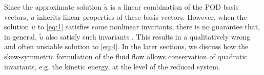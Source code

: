 Since the approximate solution $\tilde u$ is a linear combination of the POD basis vectors, $\tilde u$ inherits linear properties of these basis vectors. However, when the solution $u$ to \eqref{eq:1} satisfies some nonlinear invariants, there is no guarantee that, in general, $\tilde u$ also satisfy such invariants \cite{doi:10.1137/140959602,doi:10.1137/140978922,doi:10.1137/17M1111991,MaboudiAfkham2018}. This results in a qualitatively wrong and often unstable solution to \eqref{eq:4}. In the later sections, we discuss how the skew-symmetric formulation of the fluid flow allows conservation of quadratic invariants, e.g. the kinetic energy, at the level of the reduced system.
